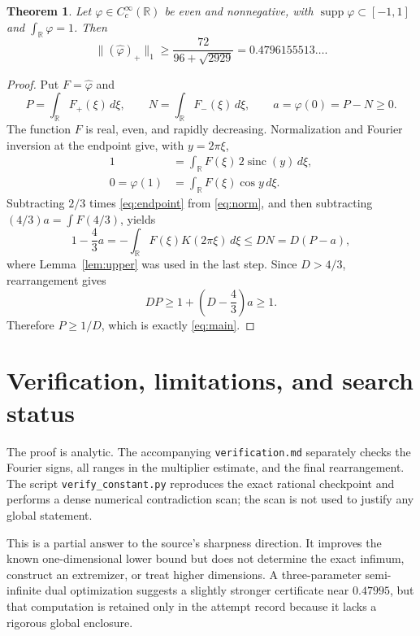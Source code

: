 \documentclass[11pt]{article}
\newtheorem{theorem}{Theorem}
\newcommand{\R}{\mathbb R}
\newcommand{\sinc}{\operatorname{sinc}}
\begin{document}
\begin{theorem}\label{thm:main}
Let $\varphi\in C_c^\infty(\R)$ be even and nonnegative, with
$\operatorname{supp}\varphi\subset[-1,1]$ and $\int_\R\varphi=1$. Then
\begin{equation}\label{eq:main}
 \boxed{\displaystyle
 \bigl\|(\widehat\varphi)_+\bigr\|_1
 \ge \frac{72}{96+\sqrt{2929}}
 =0.4796155513\ldots .}
\end{equation}
\end{theorem}

\begin{proof}
Put $F=\widehat\varphi$ and
\[
 P=\int_\R F_+(\xi)\,d\xi,
 \qquad N=\int_\R F_-(\xi)\,d\xi,
 \qquad a=\varphi(0)=P-N\ge0.
\]
The function $F$ is real, even, and rapidly decreasing. Normalization and
Fourier inversion at the endpoint give, with $y=2\pi\xi$,
\begin{align}
 1&=\int_\R F(\xi)\,2\sinc(y)\,d\xi,\label{eq:norm}\\
 0=\varphi(1)&=\int_\R F(\xi)\cos y\,d\xi.\label{eq:endpoint}
\end{align}
Subtracting $2/3$ times \eqref{eq:endpoint} from \eqref{eq:norm}, and
then subtracting $(4/3)a=\int F(4/3)$, yields
\[
 1-\frac43a
 =-\int_\R F(\xi)K(2\pi\xi)\,d\xi
 \le D N=D(P-a),
\]
where Lemma~\ref{lem:upper} was used in the last step. Since
$D>4/3$, rearrangement gives
\[
 DP\ge1+\left(D-\frac43\right)a\ge1.
\]
Therefore $P\ge1/D$, which is exactly \eqref{eq:main}.
\end{proof}

\section{Verification, limitations, and search status}

The proof is analytic. The accompanying \texttt{verification.md} separately
checks the Fourier signs, all ranges in the multiplier estimate, and the final
rearrangement. The script \texttt{verify\_constant.py} reproduces the
exact rational checkpoint and performs a dense numerical contradiction scan;
the scan is not used to justify any global statement.

This is a partial answer to the source's sharpness direction. It improves the
known one-dimensional lower bound but does not determine the exact infimum,
construct an extremizer, or treat higher dimensions. A three-parameter
semi-infinite dual optimization suggests a slightly stronger certificate near
$0.47995$, but that computation is retained only in the attempt record because
it lacks a rigorous global enclosure.
\end{document}
